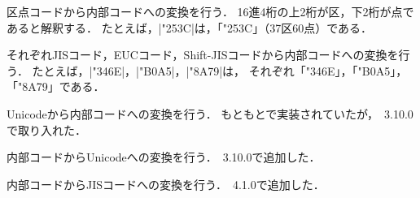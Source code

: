 \documentclass[a4paper,11pt,nomag,dvipdfmx]{jsarticle}
\begin{document}
\begin{cslist}
  区点コードから内部コードへの変換を行う．
  16進4桁の上2桁が区，下2桁が点であると解釈する．
  たとえば，|\char\kuten"253C|は，「\char\kuten"253C」（37区60点）である．

  それぞれJISコード，EUCコード，Shift-JISコードから内部コードへの変換を行う．
  たとえば，|\char\jis"346E|，|\char\euc"B0A5|，|\char\sjis"8A79|は，
  それぞれ「\char\jis"346E」，「\char\euc"B0A5」，「\char\sjis"8A79」である．

  Unicodeから内部コードへの変換を行う．
  もともと\upTeX で実装されていたが，\pTeX~3.10.0で取り入れた．

  内部コードからUnicodeへの変換を行う．\pTeX~3.10.0で追加した．

  内部コードからJISコードへの変換を行う．\pTeX~4.1.0で追加した．
\end{cslist}
\end{document}
